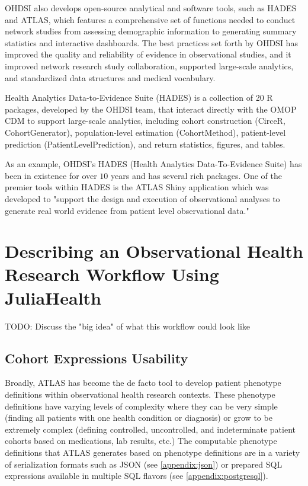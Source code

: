 \documentclass{juliacon}
\begin{document}
OHDSI also develops open-source analytical and software tools, such as HADES and ATLAS, which features a comprehensive set of functions needed to conduct network studies from assessing demographic information to generating summary statistics and interactive dashboards. The best practices set forth by OHDSI has improved the quality and reliability of evidence in observational studies, and it improved network research study collaboration, supported large-scale analytics, and standardized data structures and medical vocabulary.  

Health Analytics Data-to-Evidence Suite (HADES) is a collection of 20 R packages, developed by the OHDSI team, that interact directly with the OMOP CDM to support large-scale analytics, including cohort construction (CirceR, CohortGenerator), population-level estimation (CohortMethod), patient-level prediction (PatientLevelPrediction), and return statistics, figures, and tables. 

As an example, OHDSI's HADES (Health Analytics Data-To-Evidence Suite) has been in existence for over $10$ years and has several rich packages.
One of the premier tools within HADES is the ATLAS Shiny application which was developed to "support the design and execution of observational analyses to generate real world evidence from patient level observational data."

\section{Describing an Observational Health Research Workflow Using JuliaHealth}

TODO: Discuss the "big idea" of what this workflow could look like

\subsection{Cohort Expressions Usability}

Broadly, ATLAS has become the de facto tool to develop patient phenotype definitions within observational health research contexts.
These phenotype definitions have varying levels of complexity where they can be very simple (finding all patients with one health condition or diagnosis) or grow to be extremely complex (defining controlled, uncontrolled, and indeterminate patient cohorts based on medications, lab results, etc.)
The computable phenotype definitions that ATLAS generates based on phenotype definitions are in a variety of serialization formats such as JSON (see \ref{appendix:json}) or prepared SQL expressions available in multiple SQL flavors (see \ref{appendix:postgresql}).
\end{document}
